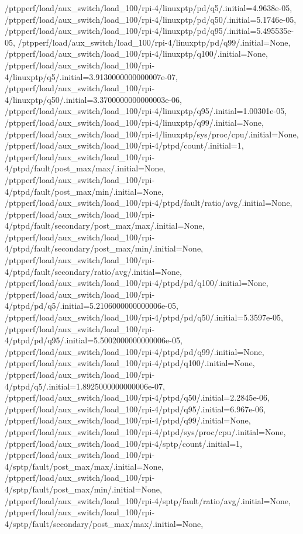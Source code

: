 {    /ptpperf/load/aux_switch/load_100/rpi-4/linuxptp/pd/q5/.initial=4.9638e-05,
    /ptpperf/load/aux_switch/load_100/rpi-4/linuxptp/pd/q50/.initial=5.1746e-05,
    /ptpperf/load/aux_switch/load_100/rpi-4/linuxptp/pd/q95/.initial=5.495535e-05,
    /ptpperf/load/aux_switch/load_100/rpi-4/linuxptp/pd/q99/.initial=None,
    /ptpperf/load/aux_switch/load_100/rpi-4/linuxptp/q100/.initial=None,
    /ptpperf/load/aux_switch/load_100/rpi-4/linuxptp/q5/.initial=3.9130000000000007e-07,
    /ptpperf/load/aux_switch/load_100/rpi-4/linuxptp/q50/.initial=3.3700000000000003e-06,
    /ptpperf/load/aux_switch/load_100/rpi-4/linuxptp/q95/.initial=1.00301e-05,
    /ptpperf/load/aux_switch/load_100/rpi-4/linuxptp/q99/.initial=None,
    /ptpperf/load/aux_switch/load_100/rpi-4/linuxptp/sys/proc/cpu/.initial=None,
    /ptpperf/load/aux_switch/load_100/rpi-4/ptpd/count/.initial=1,
    /ptpperf/load/aux_switch/load_100/rpi-4/ptpd/fault/post_max/max/.initial=None,
    /ptpperf/load/aux_switch/load_100/rpi-4/ptpd/fault/post_max/min/.initial=None,
    /ptpperf/load/aux_switch/load_100/rpi-4/ptpd/fault/ratio/avg/.initial=None,
    /ptpperf/load/aux_switch/load_100/rpi-4/ptpd/fault/secondary/post_max/max/.initial=None,
    /ptpperf/load/aux_switch/load_100/rpi-4/ptpd/fault/secondary/post_max/min/.initial=None,
    /ptpperf/load/aux_switch/load_100/rpi-4/ptpd/fault/secondary/ratio/avg/.initial=None,
    /ptpperf/load/aux_switch/load_100/rpi-4/ptpd/pd/q100/.initial=None,
    /ptpperf/load/aux_switch/load_100/rpi-4/ptpd/pd/q5/.initial=5.2106000000000006e-05,
    /ptpperf/load/aux_switch/load_100/rpi-4/ptpd/pd/q50/.initial=5.3597e-05,
    /ptpperf/load/aux_switch/load_100/rpi-4/ptpd/pd/q95/.initial=5.5002000000000006e-05,
    /ptpperf/load/aux_switch/load_100/rpi-4/ptpd/pd/q99/.initial=None,
    /ptpperf/load/aux_switch/load_100/rpi-4/ptpd/q100/.initial=None,
    /ptpperf/load/aux_switch/load_100/rpi-4/ptpd/q5/.initial=1.8925000000000006e-07,
    /ptpperf/load/aux_switch/load_100/rpi-4/ptpd/q50/.initial=2.2845e-06,
    /ptpperf/load/aux_switch/load_100/rpi-4/ptpd/q95/.initial=6.967e-06,
    /ptpperf/load/aux_switch/load_100/rpi-4/ptpd/q99/.initial=None,
    /ptpperf/load/aux_switch/load_100/rpi-4/ptpd/sys/proc/cpu/.initial=None,
    /ptpperf/load/aux_switch/load_100/rpi-4/sptp/count/.initial=1,
    /ptpperf/load/aux_switch/load_100/rpi-4/sptp/fault/post_max/max/.initial=None,
    /ptpperf/load/aux_switch/load_100/rpi-4/sptp/fault/post_max/min/.initial=None,
    /ptpperf/load/aux_switch/load_100/rpi-4/sptp/fault/ratio/avg/.initial=None,
    /ptpperf/load/aux_switch/load_100/rpi-4/sptp/fault/secondary/post_max/max/.initial=None,
}

